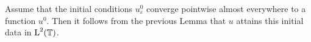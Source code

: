 \begin{remark}
	Assume that the initial conditions $ u_{ \varepsilon }^{ 0 } $ converge 
	pointwise almost everywhere to a function $ u^{ 0 } $. Then it follows from 
	the previous Lemma that $ u $ attains this initial data in $ \operatorname{L}^{ 2 } ( 
	\operatorname{\mathbb{T}} ) $.
\end{remark}

